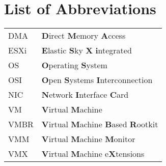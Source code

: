\chapter{List of Abbreviations}
\begin{flushleft}
\renewcommand{\baselinestretch}{1.5}
\small\normalsize
\begin{longtable}{ll}
	DMA & \textbf{D}irect \textbf{M}emory \textbf{A}ccess \\
	ESXi & \textbf{E}lastic \textbf{S}ky \textbf{X} \textbf{i}ntegrated \\
	OS & \textbf{O}perating \textbf{S}ystem \\
	OSI & \textbf{O}pen \textbf{S}ystems \textbf{I}nterconnection\\
	NIC & \textbf{N}etwork \textbf{I}nterface \textbf{C}ard \\
	VM & \textbf{V}irtual \textbf{M}achine \\
	VMBR	& \textbf{V}irtual \textbf{M}achine \textbf{B}ased \textbf{R}ootkit \\
	VMM & \textbf{V}irtual \textbf{M}achine \textbf{M}onitor \\
	VMX & \textbf{V}irtual \textbf{M}achine e\textbf{X}tensions \\
\end{longtable}
\end{flushleft}